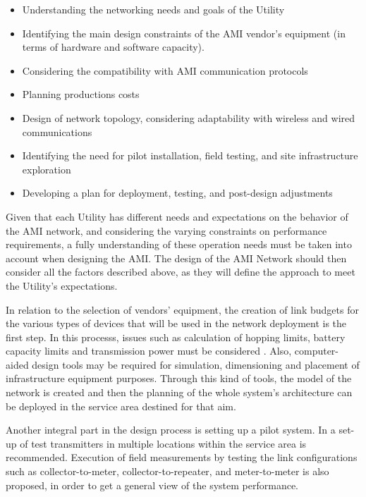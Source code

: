 \documentclass[11pt,draftclsnofoot,onecolumn]{IEEEtran}
\begin{document}
\begin{itemize}
\item Understanding the networking needs and goals of the Utility
\item Identifying the main design constraints of the AMI vendor's equipment (in terms of hardware and software capacity).
\item Considering the compatibility with AMI communication protocols
\item Planning productions costs
\item Design of network topology, considering adaptability with wireless and wired communications
\item Identifying the need for pilot installation, field testing, and site infrastructure exploration
\item Developing a plan for deployment, testing, and post-design adjustments


\end{itemize}
		
Given that each Utility has different needs and expectations on the behavior of the AMI network, and considering the varying constraints on performance requirements, a fully understanding of these operation needs must be taken into account when designing the AMI. The design of the AMI Network should then consider all the factors described above, as they will define the approach to meet the Utility’s expectations.

In relation to the selection of vendors' equipment, the creation of link budgets for the various types of devices that will be used in the network deployment is the first step. In this processs, issues such as calculation of hopping limits, battery capacity limits and transmission power must be considered \cite{Leon2011}. Also, computer-aided design tools may be required for simulation, dimensioning and placement of infrastructure equipment purposes.  Through this kind of tools, the model of the network is created and then the planning of the whole system’s architecture can be deployed in the service area destined for that aim.

Another integral part in the design process is setting up a pilot system. In \cite{Leon2011}  a set-up of test transmitters in multiple locations within the service area is recommended. Execution of field measurements by testing the link configurations such as collector-to-meter, collector-to-repeater, and meter-to-meter is also proposed, in order to get a general view of the system performance.  
\end{document}

